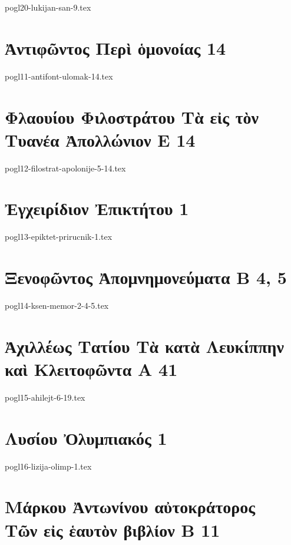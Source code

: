 \documentclass[a4paper,12pt,twoside]{report}
\begin{document}
{pogl20-lukijan-san-9.tex}

\chapter[Ἀντιφῶντος Περὶ ὁμονοίας]{\textgreek[variant=ancient]{Ἀντιφῶντος Περὶ ὁμονοίας} 14}

{pogl11-antifont-ulomak-14.tex}

\chapter[Φιλοστράτου Tὰ εἰς τὸν Τυανέα Ἀπολλώνιον Ε]{\textgreek[variant=ancient]{Φλαουίου Φιλοστράτου Tὰ εἰς τὸν Τυανέα Ἀπολλώνιον Ε} 14}

{pogl12-filostrat-apolonije-5-14.tex}

\chapter[Ἐγχειρίδιον Ἐπικτήτου]{\textgreek[variant=ancient]{Ἐγχειρίδιον Ἐπικτήτου} 1}

{pogl13-epiktet-prirucnik-1.tex}

\chapter[Ξενοφῶντος Ἀπομνημονεύματα Β]{\textgreek[variant=ancient]{Ξενοφῶντος Ἀπομνημονεύματα Β} 4, 5}

{pogl14-ksen-memor-2-4-5.tex}

\chapter[ Ἀχιλλέως Τατίου Tὰ κατὰ Λευκίππην καὶ Κλειτοφῶντα]{\textgreek[variant=ancient]{ Ἀχιλλέως Τατίου Tὰ κατὰ Λευκίππην καὶ Κλειτοφῶντα Α} 41}

{pogl15-ahilejt-6-19.tex}

\chapter[Λυσίου Ὀλυμπιακός]{\textgreek[variant=ancient]{Λυσίου Ὀλυμπιακός} 1}

{pogl16-lizija-olimp-1.tex}

\chapter[Μάρκου Ἀντωνίνου Τῶν εἰς ἑαυτὸν Β]{\textgreek[variant=ancient]{Μάρκου Ἀντωνίνου αὐτοκράτορος \\Τῶν εἰς ἑαυτὸν βιβλίον Β} 11}
\end{document}

